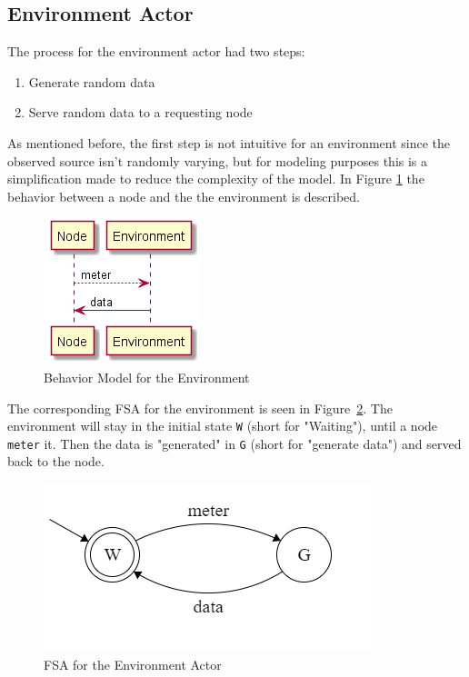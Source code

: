 \subsection{Environment Actor}

The process for the environment actor had two steps:

\begin{enumerate}
\item Generate random data
\item Serve random data to a requesting node 
\end{enumerate}

As mentioned before, the first step is not intuitive for an environment since the observed source isn't randomly varying, but for modeling purposes this is a simplification made to reduce the complexity of the model. In Figure \ref{fig:behav_example} the behavior between a node and the the environment is described.


\begin{figure}[ht]
    \includegraphics[]{include/figures/env_behav}
    \caption{Behavior Model for the Environment}
    \label{fig:behav_example}
\end{figure}

The corresponding FSA for the environment is seen in Figure~\ref{fig:env_states}. The environment will stay in the initial state \texttt{W} (short for "Waiting"), until a node \texttt{meter} it. Then the data is "generated" in \texttt{G} (short for "generate data") and served back to the node.  


\begin{figure}
    \includegraphics{include/figures/environment_actor}
    \caption{FSA for the Environment Actor}
    \label{fig:env_states}
\end{figure}

